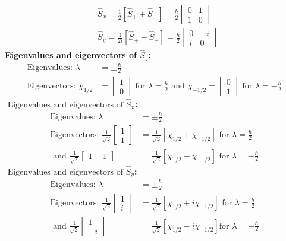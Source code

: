 $$\begin{aligned}
	&\hat{S}_{x}=\frac{1}{2}\left[\hat{S}_{+}+\hat{S}_{-}\right]=\frac{\hbar}{2}\left[\begin{array}{ll}
		0 & 1 \\
		1 & 0
	\end{array}\right] \\
	&\hat{S}_{y}=\frac{1}{2 i}\left[\hat{S}_{+}-\hat{S}_{-}\right]=\frac{\hbar}{2}\left[\begin{array}{ll}
		0 & -i \\
		i & 0
	\end{array}\right]
\end{aligned}$$
\textbf{ Eigenvalues and eigenvectors of  $\hat{S}_{z}$:}
\begin{align*}
\text{Eigenvalues: }\lambda&=\pm \frac{\hbar}{2}\\
\text{Eigenvectors: }\chi_{1 / 2}&=\left[\begin{array}{l}1 \\ 0\end{array}\right]\text{ for } \lambda=\frac{\hbar}{2}\text{ and }\chi_{-1 / 2}=\left[\begin{array}{c}0 \\ 1\end{array}\right]\text{ for }\lambda=-\frac{\hbar}{2}
\end{align*}
\textbf{$\text { Eigenvalues and eigenvectors of } \hat{S}_{x}$:}
\begin{align*}
\text{Eigenvalues: }\lambda&=\pm \frac{\hbar}{2}\\
\text{Eigenvectors: }\frac{1}{\sqrt{2}}\left[\begin{array}{l}1 \\ 1\end{array}\right]&=\frac{1}{\sqrt{2}}\left[\chi_{1 / 2}+\chi_{-1 / 2}\right]\text{ for } \lambda=\frac{\hbar}{2}\\
\text{ and }\frac{1}{\sqrt{2}}\left[\begin{array}{l}1  -1\end{array}\right]&=\frac{1}{\sqrt{2}}\left[\chi_{1 / 2}-\chi_{-1 / 2}\right]\text{ for } \lambda=-\frac{\hbar}{2}
\end{align*}
\textbf{$\text { Eigenvalues and eigenvectors of } \hat{S}_{y}$:}
\begin{align*}
\text{Eigenvalues: }\lambda&=\pm \frac{\hbar}{2}\\
\text{Eigenvectors: }\frac{1}{\sqrt{2}}\left[\begin{array}{l}1 \\ i\end{array}\right]&=\frac{1}{\sqrt{2}}\left[\chi_{1 / 2}+i \chi_{-1 / 2}\right] \text{ for }\lambda=\frac{\hbar}{2}\\
\text{ and }\frac{1}{\sqrt{2}}\left[\begin{array}{l}1 \\ -i\end{array}\right]&=\frac{1}{\sqrt{2}}\left[\chi_{1 / 2}-i \chi_{-1 / 2}\right] \text{for }\lambda=-\frac{\hbar}{2}
\end{align*}




